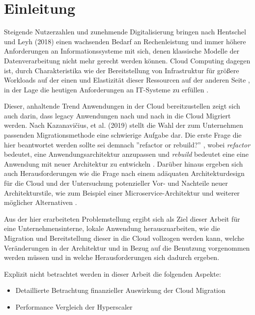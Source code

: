 \chapter{Einleitung}
Steigende Nutzerzahlen und zunehmende Digitalisierung bringen nach Hentschel und Leyh (2018) einen wachsenden Bedarf an Rechenleistung und immer höhere Anforderungen an Informationssysteme mit sich, denen klassische Modelle der Datenverarbeitung nicht mehr gerecht werden können. Cloud Computing dagegen ist, durch Charakteristika wie der Bereitstellung von Infrastruktur für größere Workloads auf der einen und Elastizität dieser Ressourcen auf der anderen Seite \cite[Vgl.][S. 2]{Mell2011}, in der Lage die heutigen Anforderungen an IT-Systeme zu erfüllen \cite[Vgl.][S. 6]{Reinheimer2018}.

Dieser, anhaltende Trend Anwendungen in der Cloud bereitzustellen zeigt sich auch darin, dass legacy Anwendungen nach und nach in die Cloud Migriert werden. Nach Kazanavičius, et al. (2019) stellt die Wahl der zum Unternehmen passenden Migrationsmethode eine schwierige Aufgabe dar. Die erste Frage die hier beantwortet werden sollte sei demnach ''refactor or rebuild?'' \cite[Vgl.][S. 4]{Kazanavicius2019}, wobei \textit{refactor} bedeutet, eine Anwendungsarchitektur anzupassen und \textit{rebuild} bedeutet eine eine Anwendung mit neuer Architektur zu entwickeln \cite[Vgl.][S. 2]{Ahmad2018}. Darüber hinaus ergeben sich auch Herausforderungen wie die Frage nach einem adäquaten Architekturdesign für die Cloud \cite[Vgl.][S. 14]{Pahl} und der Untersuchung potenzieller Vor- und Nachteile neuer Architekturstile, wie zum Beispiel einer Microservice-Architektur und weiterer möglicher Alternativen \cite[Vgl.][S. 3]{Carrasco2018}.

Aus der hier erarbeiteten Problemstellung ergibt sich als Ziel dieser Arbeit für eine Unternehmensinterne, lokale Anwendung herauszuarbeiten, wie die Migration und Bereitstellung dieser in die Cloud vollzogen werden kann, welche Veränderungen in der Architektur und in Bezug auf die Benutzung vorgenommen werden müssen und in welche Herausforderungen sich dadurch ergeben.

Explizit nicht betrachtet werden in dieser Arbeit die folgenden Aspekte:
\begin{itemize}
\item Detaillierte Betrachtung finanzieller Auswirkung der Cloud Migration
\item Performance Vergleich der Hyperscaler
\end{itemize}

\pagebreak



